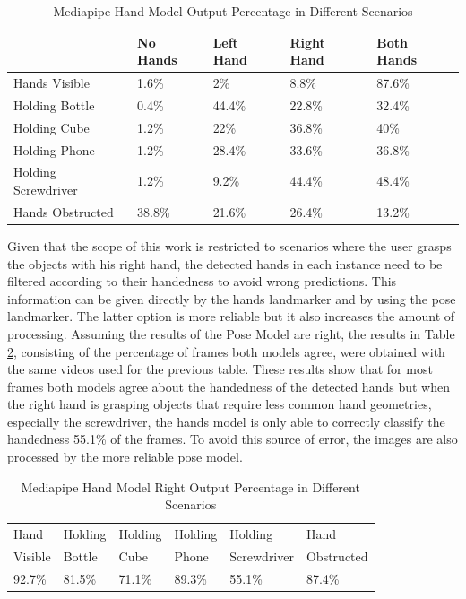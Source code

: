 \begin{table}[H]
    \centering
    \caption{Mediapipe Hand Model Output Percentage in Different Scenarios}
    \label{table:mediapipe_metrics}
    \begin{tabular}{|l|l|l|l|l|}
        \hline
        & No Hands & Left Hand & Right Hand & Both Hands \\
        \hline
        Hands Visible & 1.6\% & 2\% & 8.8\% & 87.6\% \\
        \hline
        Holding Bottle & 0.4\% & 44.4\% & 22.8\% & 32.4\% \\
        \hline
        Holding Cube & 1.2\% & 22\% & 36.8\% & 40\% \\
        \hline
        Holding Phone & 1.2\% & 28.4\% & 33.6\% & 36.8\% \\
        \hline
        Holding Screwdriver & 1.2\% & 9.2\% & 44.4\% & 48.4\% \\
        \hline
        Hands Obstructed & 38.8\% & 21.6\% & 26.4\% & 13.2\% \\
        \hline
    \end{tabular}
\end{table}

Given that the scope of this work is restricted to scenarios where the user grasps the objects with his right hand, the detected hands in each instance need to be filtered according to their handedness to avoid wrong predictions. This information can be given directly by the hands landmarker and by using the pose landmarker. The latter option is more reliable but it also increases the amount of processing. Assuming the results of the Pose Model are right, the results in Table \ref{table:mediapipe_metrics2}, consisting of the percentage of frames both models agree, were obtained with the same videos used for the previous table. These results show that for most frames both models agree about the handedness of the detected hands but when the right hand is grasping objects that require less common hand geometries, especially the screwdriver, the hands model is only able to correctly classify the handedness 55.1\% of the frames. To avoid this source of error, the images are also processed by the more reliable pose model.

\begin{table}[H]
    \centering
    \caption{Mediapipe Hand Model Right Output Percentage in Different Scenarios}
    \label{table:mediapipe_metrics2}
    \begin{tabular}{|l|l|l|l|l|l|}
        \hline
        Hand\multirow{2}{*}{} & Holding\multirow{2}{*}{} & Holding\multirow{2}{*}{} & Holding\multirow{2}{*}{} & Holding\multirow{2}{*}{} & Hand\multirow{2}{*}{} \\
        Visible & Bottle & Cube & Phone & Screwdriver & Obstructed \\
        \hline
        92.7\% & 81.5\% & 71.1\% & 89.3\% & 55.1\% & 87.4\% \\
        \hline
    \end{tabular}
\end{table}

